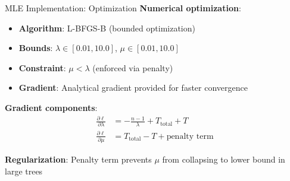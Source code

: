 \documentclass{beamer}
\begin{document}
\begin{frame}{MLE Implementation: Optimization}
    \textbf{Numerical optimization}:
    \begin{itemize}
        \item \textbf{Algorithm}: L-BFGS-B (bounded optimization)
        \item \textbf{Bounds}: $\lambda \in [0.01, 10.0]$, $\mu \in [0.01, 10.0]$
        \item \textbf{Constraint}: $\mu < \lambda$ (enforced via penalty)
        \item \textbf{Gradient}: Analytical gradient provided for faster convergence
    \end{itemize}
    
    \vspace{0.3cm}
    \textbf{Gradient components}:
    \begin{align*}
        \frac{\partial \ell}{\partial \lambda} &= -\frac{n-1}{\lambda} + T_{\text{total}} + T \\
        \frac{\partial \ell}{\partial \mu} &= T_{\text{total}} - T + \text{penalty term}
    \end{align*}
    
    \vspace{0.2cm}
    \textbf{Regularization}: Penalty term prevents $\mu$ from collapsing to lower bound in large trees
\end{frame}
\end{document}
